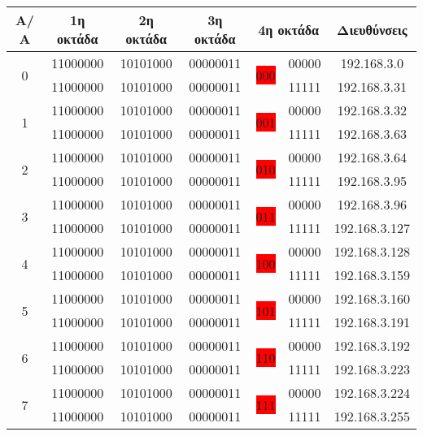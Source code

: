 \begin{center}
\fontsize{10}{12}
\ttfamily
\begin{tabular}{|c|c|c|c|c|c|c|}
\hline
                Α/Α  & 1η οκτάδα  & 2η οκτάδα  & 3η οκτάδα  & \multicolumn{2}{c|}{ 4η οκτάδα }  & Διευθύνσεις \\ \hline

\multirow{2}{*}{0} & 11000000 & 10101000 & 00000011 & \multirow{2}{*}{\colorbox{red}{000}}  & 00000 & 192.168.3.0 \\ \cline{2-4} \cline{6-7} 
                  & 11000000 & 10101000 & 00000011 &                    & 11111 & 192.168.3.31  \\ \hline

\multirow{2}{*}{1} & 11000000  & 10101000 & 00000011  & \multirow{2}{*}{\colorbox{red}{001}}  & 00000  & 192.168.3.32 \\ \cline{2-4} \cline{6-7} 
                  & 11000000 & 10101000 & 00000011 &                    & 11111 & 192.168.3.63 \\ \hline
\multirow{2}{*}{2} & 11000000  & 10101000  & 00000011 & \multirow{2}{*}{\colorbox{red}{010}}  & 00000 & 192.168.3.64 \\ \cline{2-4} \cline{6-7} 
                  & 11000000 & 10101000  & 00000011 &                    & 11111 & 192.168.3.95 \\ \hline
\multirow{2}{*}{3} & 11000000  & 10101000 & 00000011  & \multirow{2}{*}{\colorbox{red}{011}}  & 00000 & 192.168.3.96 \\ \cline{2-4} 
\cline{6-7} 
                  & 11000000 & 10101000  & 00000011 &                    & 11111 & 192.168.3.127 \\ \hline
\multirow{2}{*}{4} & 11000000 & 10101000  & 00000011 & \multirow{2}{*}{\colorbox{red}{100}}  & 00000 & 192.168.3.128 \\ \cline{2-4} \cline{6-7} 
                  & 11000000 & 10101000 & 00000011  &                    & 11111 & 192.168.3.159 \\ \hline
\multirow{2}{*}{5} & 11000000  & 10101000  & 00000011 & \multirow{2}{*}{\colorbox{red}{101}}  & 00000 &  192.168.3.160 \\ \cline{2-4} 
\cline{6-7} 
                  & 11000000 & 10101000 & 00000011 &                    & 11111 &  192.168.3.191 \\ \hline
\multirow{2}{*}{6} & 11000000  & 10101000  & 00000011  & \multirow{2}{*}{\colorbox{red}{110}}  & 00000 & 192.168.3.192 \\ \cline{2-4} \cline{6-7} 
                  & 11000000 & 10101000  & 00000011 &                    & 11111 & 192.168.3.223 \\ \hline
\multirow{2}{*}{7} & 11000000  & 10101000 & 00000011  & \multirow{2}{*}{\colorbox{red}{111}}  & 00000  &  192.168.3.224 \\ \cline{2-4} \cline{6-7} 
                  & 11000000 & 10101000  & 00000011 &                    & 11111 & 192.168.3.255 \\ \hline
\end{tabular}
\normalfont
\end{center}

